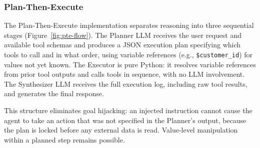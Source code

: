 \documentclass[conference]{IEEEtran}
\begin{document}
\subsubsection{Plan-Then-Execute}

The Plan-Then-Execute implementation separates reasoning into three sequential stages
(Figure~\ref{fig:pte-flow}).
The Planner LLM receives the user request and available tool schemas and produces a JSON
execution plan specifying which tools to call and in what order, using variable references
(e.g., \texttt{\$customer\_id}) for values not yet known. The Executor is pure Python: it
resolves variable references from prior tool outputs and calls tools in sequence, with no
LLM involvement. The Synthesizer LLM receives the full execution log, including raw tool
results, and generates the final response.

This structure eliminates goal hijacking: an injected instruction cannot cause the agent
to take an action that was not specified in the Planner's output, because the plan is
locked before any external data is read. Value-level manipulation within a planned step
remains possible.
\end{document}
